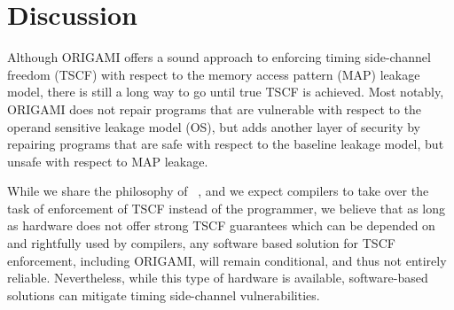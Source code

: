 


\section{Discussion}
\label{sec:Conclusion}
Although ORIGAMI offers a sound approach to enforcing timing side-channel freedom (TSCF) with respect to the memory access pattern (MAP) leakage model, there is still a long way to go until true TSCF is achieved. Most notably, ORIGAMI does not repair programs that are vulnerable with respect to the operand sensitive leakage model (OS), but adds another layer of security by repairing programs that are safe with respect to the baseline leakage model, but unsafe with respect to MAP leakage. 

While we share the philosophy of ~\cite{WhatYouCisWhatYouGet}, and we expect compilers to take over the task of enforcement of TSCF instead of the programmer, we believe that as long as hardware does not offer strong TSCF guarantees which can be depended on and rightfully used by compilers, any software based solution for TSCF enforcement, including ORIGAMI, will remain conditional, and thus not entirely reliable. Nevertheless, while this type of hardware is available, software-based solutions can mitigate timing side-channel vulnerabilities.
